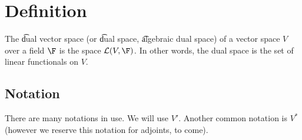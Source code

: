 
\section*{Definition}

The \t{dual vector space} (or \t{dual space}, \t{algebraic dual space}) of a vector space $V$ over a field $\F $ is the space $\mathcal{L} (V, \F )$.
In other words, the dual space is the set of linear functionals on $V$.

\subsection*{Notation}

There are many notations in use. We will use $V'$.
Another common notation is $V^*$ (however we reserve this notation for adjoints, to come).

\blankpage
